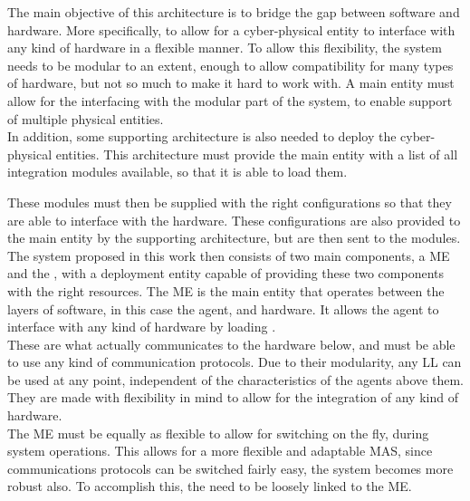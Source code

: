 The main objective of this architecture is to bridge the gap between software and hardware. More specifically, to allow for a cyber-physical entity to interface with any kind of hardware in a flexible manner. To allow this flexibility, the system needs to be modular to an extent, enough to allow compatibility for many types of hardware, but not so much to make it hard to work with. A main entity must allow for the interfacing with the modular part of the system, to enable support of multiple physical entities.\\ 

In addition, some supporting architecture is also needed to deploy the cyber-physical entities. This architecture must provide the main entity with a list of all integration modules available, so that it is able to load them.

These modules must then be supplied with the right configurations so that they are able to interface with the hardware. These configurations are also provided to the main entity by the supporting architecture, but are then sent to the modules.\\

The system proposed in this work then consists of two main components, a \acrfull{ME} and the , with a deployment entity capable of providing these two components with the right resources. The \acrlong{ME} is the main entity that operates between the layers of software, in this case the agent, and hardware. It allows the agent to interface with any kind of hardware by loading .\\

These  are what actually communicates to the hardware below, and must be able to use any kind of communication protocols. Due to their modularity, any \acrshort{LL} can be used at any point, independent of the characteristics of the agents above them. They are made with flexibility in mind to allow for the integration of any kind of hardware.\\

The \acrshort{ME} must be equally as flexible to allow for switching on the fly, during system operations. This allows for a more flexible and adaptable \acrshort{MAS}, since communications protocols can be switched fairly easy, the system becomes more robust also. To accomplish this, the  need to be loosely linked to the \acrshort{ME}.\\

